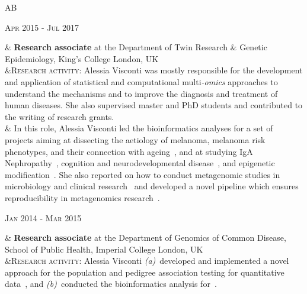 \documentclass[a4paper,10pt]{article}
\newenvironment{doubletablelist}
{
	\vspace{-0.2cm}
	\begin{longtable}[!h]{AB}}{\end{longtable}
}
\newcommand{\dtlist}[2]{
\hspace{-3cm}
\noindent
	\begin{minipage}{0.22\textwidth}
	\begin{flushright}
	\textsc{#1}
	\end{flushright}
	\end{minipage}
	& #2\\[0.2cm]
}
\begin{document}
\begin{doubletablelist}
	
	\dtlist{Apr 2015 - Jul 2017}{\textbf{Research associate} at the Department of Twin Research \& Genetic Epidemiology, King's College London, UK \\ 
	&\textsc{Research activity}: Alessia Visconti was mostly responsible for the development and application of statistical and computational multi\emph{-omics} approaches to understand the mechanisms and to improve the diagnosis and treatment of human diseases. She also supervised master and PhD students and contributed to the writing of research grants.\\
	 & In this role, Alessia Visconti led the bioinformatics analyses for a set of projects aiming at dissecting the aetiology of melanoma, melanoma risk phenotypes, and their connection with ageing~\cite{Rib16,Hys18,Vis18a,Duf17}, and at studying IgA Nephropathy~\cite{Lom16}, cognition and neurodevelopmental disease~\cite{Cul18}, and epigenetic modification~\cite{Zag18}. 
	 She also reported on how to conduct metagenomic studies in microbiology and clinical research~\cite{Vis18c} and developed a novel pipeline which ensures reproducibility in metagenomics research~\cite{Vis18b}.%
	}
	
    \dtlist{Jan 2014 - Mar 2015}{\textbf{Research associate} at the Department of Genomics of Common Disease, School of Public Health, Imperial College London, UK  \\
	 &\textsc{Research activity}: Alessia Visconti \emph{(a)}~developed and implemented a novel approach for the population and pedigree association testing for quantitative data~\cite{Vis16}, and \emph{(b)}~conducted the bioinformatics analysis for~\cite{Joh15,AlM15,Gia16,Pui16}.%
	}
	

\end{doubletablelist}
\end{document}
